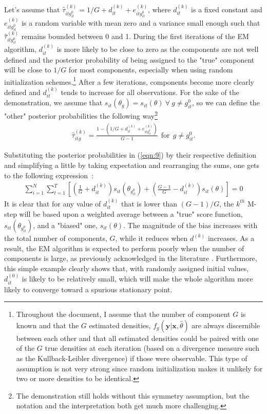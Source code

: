 \documentclass[11pt,letter]{article}
\begin{document}
Let's assume that $\hat{\tau}^{(k)}_{itg_{it}^{0}} = 1/G + d_{it}^{(k)} + e_{itg_{it}^{0}}^{(k)}$, where $d_{it}^{(k)}$ is a fixed constant and $e_{itg_{it}^{0}}^{(k)}$ is a random variable with mean zero and a variance small enough such that $\hat{\tau}^{(k)}_{itg_{it}^{0}}$ remains bounded between 0 and 1. During the first iterations of the EM algorithm, $d_{it}^{(k)}$ is more likely to be close to zero as the components are not well defined and the posterior probability of being assigned to the "true" component will be close to $1/G$ for most components, especially when using random initialization schemes.\footnote{Throughout the document, I assume that the number of component $G$ is known and that the $G$ estimated densities, $f_g(\mathbf{y}|\mathbf{x},\hat{\theta})$ are always discernible between each other and that all estimated densities could be paired with one of the $G$ true densities at each iteration (based on a divergence measure such as the Kullback-Leibler divergence) if those were observable. This type of assumption is not very strong since random initialization makes it unlikely for two or more densities to be identical.} After a few iterations, components become more clearly defined and $d_{it}^{(k)}$ tends to increase for all observations. For the sake of the demonstration, we assume that $s_{it}(\theta_g) = s_{it}(\theta) \ \forall \ g\ne g_{it}^0$, so we can define the "other" posterior probabilities the following way\footnote{The demonstration still holds without this symmetry assumption, but the notation and the interpretation both get much more challenging.}
\begin{align} \label{eqn:10}
\hat{\tau}^{(k)}_{itg} = \frac{1-(1/G + d_{it}^{(k)} + e_{itg_{it}^{0}}^{(k)})}{G-1} \ \ \text{for} \ \ g \ne g_{it}^0.
\end{align}
\par
Substituting the posterior probabilities in (\ref{eqn:9}) by their respective definition and simplifying a little by taking expectation and rearranging the sums, one gets to the following expression~:
\begin{align} \label{eqn:11}
\sum_{i=1}^N \sum_{t=1}^T \left[\left(\frac{1}{G} + d_{it}^{(k)}\right) s_{it}(\theta_{g_{it}^0}) + \left(\frac{G-1}{G} - d_{it}^{(k)}\right) s_{it}(\theta)\right] = 0
\end{align}
It is clear that for any value of $d_{it}^{(k)}$ that is lower than $(G-1)/G$, the $k^{th}$ M-step will be based upon a weighted average between a "true" score function, $s_{it}(\theta_{g_{it}^0})$, and a "biased" one, $s_{it}(\theta)$. The magnitude of the bias increases with the total number of components, $G$, while it reduces when $d^{(k)}$ increases. As a result, the EM algorithm is expected to perform poorly when the number of components is large, as previously acknowledged in the literature \citep{balakrishnan_statistical_2017}. Furthermore, this simple example clearly shows that, with randomly assigned initial values, $d_{it}^{(0)}$ is likely to be relatively small, which will make the whole algorithm more likely to converge toward a spurious stationary point.
\end{document}

